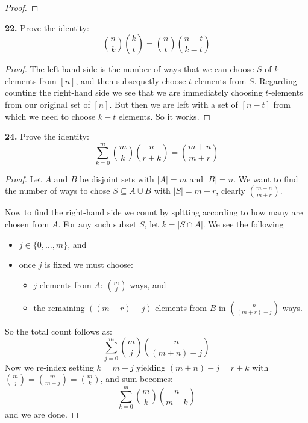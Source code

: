 \documentclass[12pt]{amsart}
\begin{document}
\begin{onehalfspace}
\begin{proof}
        \end{proof}

        \textbf{22.} Prove the identity:
        \begin{displaymath}
            \binom{n}{k}\binom{k}{t} = \binom{n}{t}\binom{n-t}{k-t}
        \end{displaymath}
        \begin{proof}
            The left-hand side is the number of ways that we can choose $S$ of $k$-elements from $[n]$, and then
            subsequetly choose $t$-elements from $S$.
            Regarding counting the right-hand side we see that we are immediately choosing $t$-elements from our
            original set of $[n]$.
            But then we are left with a set of $[n-t]$ from which we need to choose $k-t$ elements.
            So it works.
        \end{proof}

        \textbf{24.} Prove the identity:
        \begin{displaymath}
            \sum_{k=0}^m\binom{m}{k}\binom{n}{r+k} = \binom{m+n}{m+r}
        \end{displaymath}
        \begin{proof}
            Let $A$ and $B$ be disjoint sets with $|A|=m$ and $|B|=n$.
            We want to find the number of ways to chose $S\subseteq A\cup B$ with $|S| = m+r$, clearly
            $\binom{m+n}{m+r}$.

            Now to find the right-hand side we count by spltting according to how many are chosen from $A$.
            For any such subset $S$, let $k=|S\cap A|$. We see the following
            \begin{itemize}
                \item $j\in\{0,\ldots,m\}$, and
                \item once $j$ is fixed we must choose:
                \begin{itemize}
                    \item $j$-elements from $A$: $\binom{m}{j}$ ways, and
                    \item the remaining $((m+r)-j)$-elements from $B$ in $\binom{n}{(m+r)-j}$ ways.
                \end{itemize}
            \end{itemize}
            So the total count follows as:
            \begin{displaymath}
                \sum_{j=0}^m\binom{m}{j}\binom{n}{(m+n)-j}
            \end{displaymath}
            Now we re-index setting $k=m-j$ yielding $(m+n)-j = r+k$ with $\binom{m}{j}=\binom{m}{m-j} = \binom{m}{k}$,
            and sum becomes:
            \begin{displaymath}
                \sum_{k=0}^m\binom{m}{k}\binom{n}{m+k}
            \end{displaymath}
            and we are done.
        \end{proof}


\end{onehalfspace}
\end{document}
